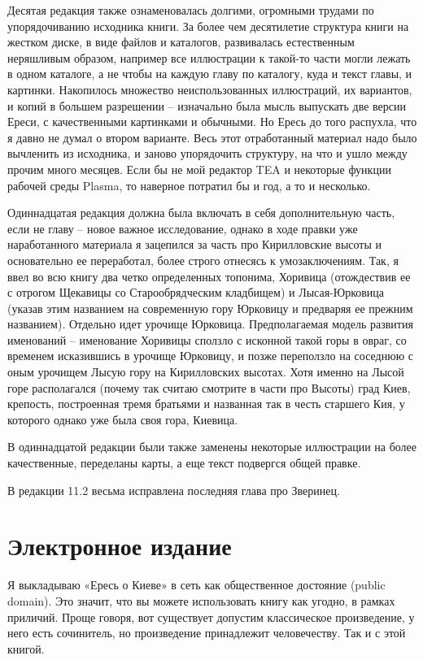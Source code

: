 Десятая редакция также ознаменовалась долгими, огромными трудами по упорядочиванию исходника книги. За более чем десятилетие структура книги на жестком диске, в виде файлов и каталогов, развивалась естественным неряшливым образом, например все иллюстрации к такой-то части могли лежать в одном каталоге, а не чтобы на каждую главу по каталогу, куда и текст главы, и картинки. Накопилось множество неиспользованных иллюстраций, их вариантов, и копий в большем разрешении – изначально была мысль выпускать две версии Ереси, с качественными картинками и обычными. Но Ересь до того распухла, что я давно не думал о втором варианте. Весь этот отработанный материал надо было вычленить из исходника, и заново упорядочить структуру, на что и ушло между прочим много месяцев. Если бы не мой редактор TEA и некоторые функции рабочей среды Plasma, то наверное потратил бы и год, а то и несколько.

Одиннадцатая редакция должна была включать в себя дополнительную часть, если не главу – новое важное исследование, однако в ходе правки уже наработанного материала я зацепился за часть про Кирилловские высоты и основательно ее переработал, более строго отнесясь к умозаключениям. Так, я ввел во всю книгу два четко определенных топонима, Хоривица (отождествив ее с отрогом Щекавицы со Старообрядческим кладбищем) и Лысая-Юрковица (указав этим названием на современную гору Юрковицу и предваряя ее прежним названием). Отдельно идет урочище Юрковица. Предполагаемая модель развития именований – именование Хоривицы сползло с исконной такой горы в овраг, со временем исказившись в урочище Юрковицу, и позже переползло на соседнюю с оным урочищем Лысую гору на Кирилловских высотах. Хотя именно на Лысой горе располагался (почему так считаю смотрите в части про Высоты) град Киев, крепость, построенная тремя братьями и названная так в честь старшего Кия, у которого однако уже была своя гора, Киевица.

В одиннадцатой редакции были также заменены некоторые иллюстрации на более качественные, переделаны карты, а еще текст подвергся общей правке.

В редакции 11.2 весьма исправлена последняя глава про Зверинец.

\section*{Электронное издание} 

Я выкладываю «Ересь о Киеве» в сеть как общественное достояние (public domain). Это значит, что вы можете использовать книгу как угодно, в рамках приличий. Проще говоря, вот существует допустим классическое произведение, у него есть сочинитель, но произведение принадлежит человечеству. Так и с этой книгой.

